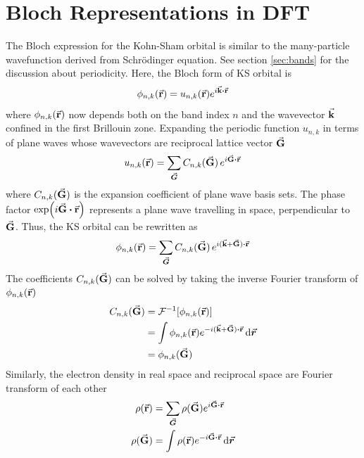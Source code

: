 \section{Bloch Representations in DFT}
The Bloch expression for the Kohn-Sham orbital is similar to the many-particle wavefunction derived from Schr\"{o}dinger equation. See section \ref{sec:bands} for the discussion about periodicity. Here, the Bloch form of KS orbital is
\begin{equation}
	\phi_{n,k}(\va{r}) = u_{n,k} (\va{r}) e^{i \va{k} \vdot \va{r}}
\end{equation}
where $\phi_{n,k}(\va{r})$ now depends both on the band index $n$ and the wavevector $\va{k}$ confined in the first Brillouin zone. Expanding the periodic function $u_{n,k}$ in terms of plane waves whose wavevectors are reciprocal lattice vector $\va{G}$
\begin{equation}
	u_{n,k} (\va{r}) =  \sum_{\va*{G}} C_{n,k}(\va{G})\, e^{i \va{G} \vdot \va{r}}
\end{equation}
where $C_{n,k}(\va{G})$ is the expansion coefficient of plane wave basis sets. The phase factor $\exp({i \va{G} \vdot \va{r}}) $ represents a plane wave travelling in space, perpendicular to $\va{G}$. Thus, the KS orbital can be rewritten as
\begin{equation} \label{eq:orbital_rec}
	\phi_{n,k}(\va{r})  = \sum_{\va*{G}} C_{n,k}(\va{G})\, e^{i (\va{k} + \va{G} ) \vdot \va{r}}
\end{equation}
The coefficients $C_{n,k}(\va{G})$ can be solved by taking the inverse Fourier transform of $\phi_{n,k}(\va{r}) $
\begin{align}
	C_{n,k}(\va{G}) & = \mathcal{F}^{-1} [\phi_{n,k}(\va{r})]                                        \\
	                & = \int \phi_{n,k}(\va{r}) e^{- i (\va{k} + \va{G} ) \vdot \va{r}} \dd{\va*{r}} \\
	                & = \phi_{n,k}(\va{G})
\end{align}
Similarly, the electron density in real space and reciprocal space are Fourier transform of each other
\begin{align}
	\rho({\va{r}}) & = \sum_{\va*{G}} \rho({\va{G}}) e^{i \va{G} \vdot \va{r}} \label{eq:density_rec} \\
	\rho({\va{G}}) & = \int \rho({\va{r}}) e^{-i \va{G} \vdot \va{r}} \dd{\va*{r}}
\end{align}


